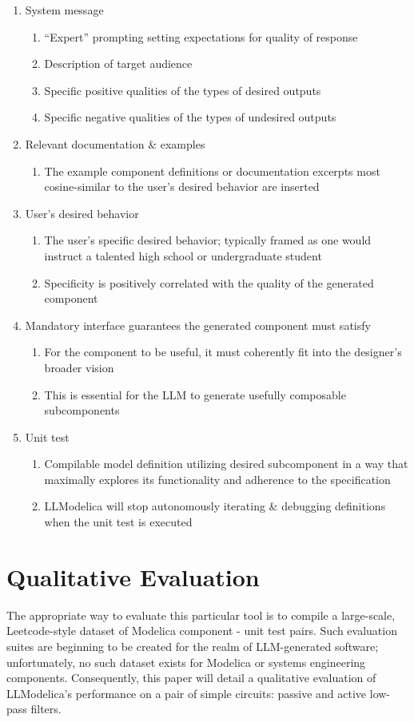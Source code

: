 \documentclass[11pt]{article}
\let\oldsection\section
\renewcommand\section{\clearpage\oldsection}
\begin{document}
\begin{enumerate}
\item System message
\begin{enumerate}
\item ``Expert'' prompting setting expectations for quality of response
\item Description of target audience
\item Specific positive qualities of the types of desired outputs
\item Specific negative qualities of the types of undesired outputs
\end{enumerate}
\item Relevant documentation \& examples
\begin{enumerate}
\item The example component definitions or documentation excerpts most cosine-similar to the user's desired behavior are inserted
\end{enumerate}
\item User's desired behavior
\begin{enumerate}
\item The user's specific desired behavior; typically framed as one would instruct a talented high school or undergraduate student
\item Specificity is positively correlated with the quality of the generated component
\end{enumerate}
\item Mandatory interface guarantees the generated component must satisfy
\begin{enumerate}
\item For the component to be useful, it must coherently fit into the designer's broader vision
\item This is essential for the LLM to generate usefully composable subcomponents
\end{enumerate}
\item Unit test
\begin{enumerate}
\item Compilable model definition utilizing desired subcomponent in a way that maximally explores its functionality and adherence to the specification
\item LLModelica will stop autonomously iterating \& debugging definitions when the unit test is executed
\end{enumerate}
\end{enumerate}


\section{Qualitative Evaluation}
\label{sec:org1d54762}
The appropriate way to evaluate this particular tool is to compile a large-scale, Leetcode-style dataset of Modelica component - unit test pairs. Such evaluation suites are beginning to be created for the realm of LLM-generated software; unfortunately, no such dataset exists for Modelica or systems engineering components. Consequently, this paper will detail a qualitative evaluation of LLModelica's performance on a pair of simple circuits: passive and active low-pass filters.
\end{document}
